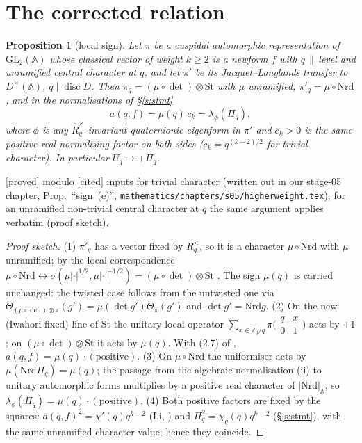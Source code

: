 \documentclass[11pt]{amsart}
\theoremstyle{plain}
\newtheorem{proposition}{Proposition}[section]
\theoremstyle{remark}
\newcommand{\Z}{\mathbb{Z}}
\newcommand{\A}{\mathbb{A}}
\newcommand{\St}{\mathrm{St}}
\newcommand{\GL}{\mathrm{GL}}
\newcommand{\Nrd}{\mathrm{Nrd}}
\newcommand{\st}[1]{\textup{\textsf{[#1]}}}
\begin{document}
\section{The corrected relation}\label{s:proof}
\begin{proposition}[local sign]\label{p:local}
Let $\pi$ be a cuspidal automorphic representation of $\GL_2(\A)$ whose classical vector of weight $k\ge2$ is a newform
$f$ with $q\,\|\,$level and unramified central character at $q$, and let $\pi'$ be its Jacquet--Langlands transfer
to $D^\times(\A)$, $q\mid\operatorname{disc}D$. Then $\pi_q=(\mu\circ\det)\otimes\St$ with $\mu$ unramified,
$\pi'_q=\mu\circ\Nrd$, and in the normalisations of \S\ref{s:stmt}
\[a(q,f)=\mu(q)\,c_k=\lambda_{\phi}(\Pi_q),\]
where $\phi$ is any $\widehat R^\times_q$-invariant quaternionic eigenform in $\pi'$ and $c_k>0$ is the same positive
real normalising factor on both sides ($c_k=q^{(k-2)/2}$ for trivial character). In particular $U_q\mapsto+\Pi_q$.
\end{proposition}
\noindent\st{proved} modulo \st{cited} inputs for trivial character (written out in our stage-05 chapter, Prop.~``sign~(e)'',
\texttt{mathematics/chapters/s05/higherweight.tex}); for an unramified non-trivial central character at $q$ the same
argument applies verbatim (proof sketch).
\begin{proof}[Proof sketch]
(1) $\pi'_q$ has a vector fixed by $R_q^\times$, so it is a character $\mu\circ\Nrd$ with $\mu$ unramified; by the local
correspondence $\mu\circ\Nrd\leftrightarrow\sigma(\mu|\cdot|^{1/2},\mu|\cdot|^{-1/2})=(\mu\circ\det)\otimes\St$
\cite[\S15, Thm.~15.1, p.~471, and the paragraph after Lemma~15.4, p.~484]{JL}. The sign $\mu(q)$ is carried unchanged:
the twisted case follows from the untwisted one via $\Theta_{(\mu\circ\det)\otimes\pi}(g')=\mu(\det g')\Theta_\pi(g')$ and
$\det g'=\Nrd g$. (2) On the new (Iwahori-fixed) line of $\St$ the unitary local operator
$\sum_{x\in\Z_q/q}\pi\big(\begin{smallmatrix}q&x\\0&1\end{smallmatrix}\big)$ acts by $+1$ \cite[Prop.~2.2 and its proof,
pp.~12--13]{Hs}; on $(\mu\circ\det)\otimes\St$ it acts by $\mu(q)$. With (2.7) of \cite{Hs},
$a(q,f)=\mu(q)\cdot(\text{positive})$. (3) On $\mu\circ\Nrd$ the uniformiser acts by $\mu(\Nrd\Pi_q)=\mu(q)$; the passage
from the algebraic normalisation (ii) to unitary automorphic forms multiplies by a positive real character of
$|\Nrd|_\A$, so $\lambda_\phi(\Pi_q)=\mu(q)\cdot(\text{positive})$. (4) Both positive factors are fixed by the squares:
$a(q,f)^2=\chi'(q)q^{k-2}$ (Li, \cite[Thm.~3(iii), pp.~295--296]{Li}) and $\Pi_q^2=\chi_q(q)q^{k-2}$ (\S\ref{s:stmt}), with
the same unramified character value; hence they coincide.
\end{proof}
\end{document}
